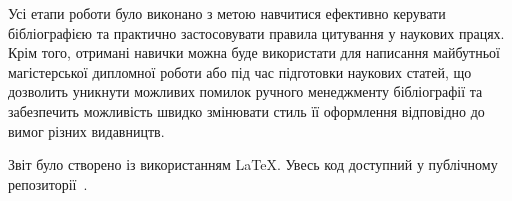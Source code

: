 \documentclass{article}
\begin{document}
Усі етапи роботи було виконано з метою навчитися ефективно керувати бібліографією та практично застосовувати правила цитування у наукових працях. Крім того, отримані навички можна буде використати для написання майбутньої магістерської дипломної роботи або під час підготовки наукових статей, що дозволить уникнути можливих помилок ручного менеджменту бібліографії та забезпечить можливість швидко змінювати стиль її оформлення відповідно до вимог різних видавництв.

Звіт було створено із використанням \LaTeX{}. Увесь код доступний у публічному репозиторії~\cite{github_science}.

\clearpage
\printbibliography[heading=bibintoc,title={СПИСОК ВИКОРИСТАНИХ ДЖЕРЕЛ}]
\end{document}
